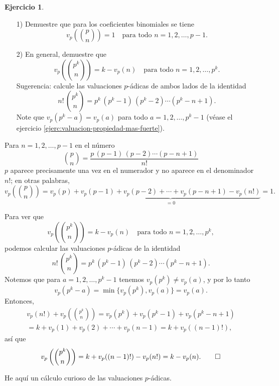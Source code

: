 \documentclass{article}
\numberwithin{equation}{section}
\theoremstyle{definition}
\newtheorem{ejerc}{Ejercicio}
\begin{document}
\begin{ejerc}
  ~

  \begin{enumerate}
  \item[1)] Demuestre que para los coeficientes binomiales se tiene
    \[ v_p \left( {p\choose n} \right) = 1
       \quad \text{para todo }n = 1,2,\ldots,p-1. \]

  \item[2)] En general, demuestre que
    \[ v_p \left( {p^k\choose n} \right) = k - v_p (n)
       \quad \text{para todo }n = 1,2,\ldots,p^k. \]
    Sugerencia: calcule las valuaciones $p$-ádicas de ambos lados de
    la identidad
    $$n!\,{p^k\choose n} = p^k\,(p^k - 1)\,(p^k-2)\cdots (p^k-n+1).$$
    Note que $v_p (p^k - a) = v_p (a)$ para todo $a = 1,2,\ldots,p^k-1$
    (véase el ejercicio \ref{ejerc:valuacion-propiedad-mas-fuerte}).
  \end{enumerate}

  \ifdefined\solutions\begin{solucion}
    Para $n = 1,2,\ldots,p-1$ en el número
    $${p\choose n} = \frac{p\,(p-1)\,(p-2)\cdots (p-n+1)}{n!}$$
    $p$ aparece precisamente una vez en el numerador y no aparece en
    el denominador $n!$; en otras palabras,
    \[ v_p \left({p\choose n}\right) =
       v_p(p) + \underbrace{v_p(p-1) + v_p(p-2) + \cdots
           + v_p(p-n+1) - v_p(n!)}_{=0} = 1. \]

    Para ver que
    \[ v_p \left( {p^k\choose n} \right) = k - v_p (n)
       \quad \text{para todo }n = 1,2,\ldots,p^k, \]
    podemos calcular las valuaciones $p$-ádicas de la identidad
    $$n!\,{p^k\choose n} = p^k\,(p^k - 1)\,(p^k-2)\cdots (p^k-n+1).$$
    Notemos que para $a = 1,2,\ldots,p^k-1$ tenemos $v_p (p^k) \ne v_p (a)$,
    y por lo tanto
    $$v_p (p^k - a) = \min \{ v_p (p^k), v_p (a) \} = v_p (a).$$
    Entonces,
    \begin{multline*}
      v_p (n!) + v_p \left( {p^k\choose n} \right) =
      v_p (p^k) + v_p (p^k - 1) + v_p (p^k - n + 1) \\
      = k + v_p (1) + v_p (2) + \cdots + v_p (n-1) =
      k + v_p ((n-1)!),
    \end{multline*}
    así que
    \[ v_p \left( {p^k\choose n} \right) =
       k + v_p ((n-1)!) - v_p (n!) = k - v_p (n). \qedhere \]
  \end{solucion}\fi
\end{ejerc}

He aquí un cálculo curioso de las valuaciones $p$-ádicas.
\end{document}
